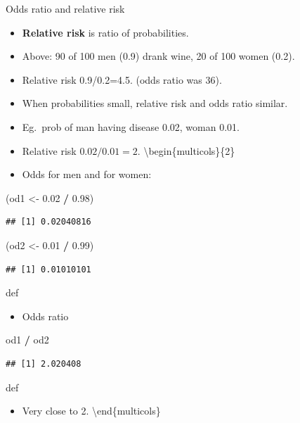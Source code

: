 \documentclass[ignorenonframetext,]{beamer}
\newenvironment{Shaded}{\begin{snugshade}}{\end{snugshade}}
\newcommand{\FloatTok}[1]{\textcolor[rgb]{0.00,0.00,0.81}{#1}}
\newcommand{\NormalTok}[1]{#1}
\newcommand{\OperatorTok}[1]{\textcolor[rgb]{0.81,0.36,0.00}{\textbf{#1}}}
\newcommand{\StringTok}[1]{\textcolor[rgb]{0.31,0.60,0.02}{#1}}
\providecommand{\tightlist}{%
  \setlength{\itemsep}{0pt}\setlength{\parskip}{0pt}}
\begin{document}
\begin{frame}[fragile]{Odds ratio and relative risk}
\protect\hypertarget{odds-ratio-and-relative-risk}{}

\begin{itemize}
\item
  \textbf{Relative risk} is ratio of probabilities.
\item
  Above: 90 of 100 men (0.9) drank wine, 20 of 100 women (0.2).
\item
  Relative risk 0.9/0.2=4.5. (odds ratio was 36).
\item
  When probabilities small, relative risk and odds ratio similar.
\item
  Eg.~prob of man having disease 0.02, woman 0.01.
\item
  Relative risk \(0.02/0.01=2\). \textbackslash{}begin\{multicols\}\{2\}
\item
  Odds for men and for women:
\end{itemize}

\begin{Shaded}
\begin{Highlighting}[]
\NormalTok{(od1 <-}\StringTok{ }\FloatTok{0.02} \OperatorTok{/}\StringTok{ }\FloatTok{0.98}\NormalTok{)}
\end{Highlighting}
\end{Shaded}

\begin{verbatim}
## [1] 0.02040816
\end{verbatim}

\begin{Shaded}
\begin{Highlighting}[]
\NormalTok{(od2 <-}\StringTok{ }\FloatTok{0.01} \OperatorTok{/}\StringTok{ }\FloatTok{0.99}\NormalTok{)}
\end{Highlighting}
\end{Shaded}

\begin{verbatim}
## [1] 0.01010101
\end{verbatim}

def

\begin{itemize}
\tightlist
\item
  Odds ratio
\end{itemize}

\begin{Shaded}
\begin{Highlighting}[]
\NormalTok{od1 }\OperatorTok{/}\StringTok{ }\NormalTok{od2}
\end{Highlighting}
\end{Shaded}

\begin{verbatim}
## [1] 2.020408
\end{verbatim}

def

\begin{itemize}
\tightlist
\item
  Very close to 2. \textbackslash{}end\{multicols\}
\end{itemize}

\end{frame}
\end{document}
